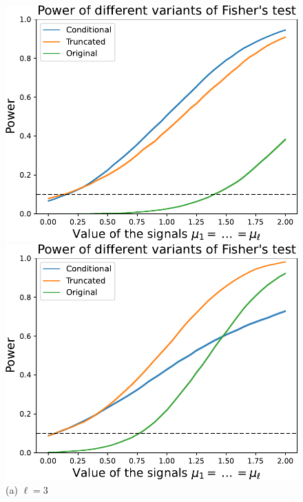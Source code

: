 \documentclass{article}
\begin{document}
\begin{figure}
    \centering
    \hspace{-0.035\textwidth}
    \begin{minipage}{0.32\textwidth}
        \centering
        \includegraphics[width=\textwidth]{fig/fisher_ell=3.pdf}
        \caption*{(a) $\ell=3$}
    \end{minipage}
    \hfill
    \hspace{0.01\textwidth}
    \begin{minipage}{0.32\textwidth}
        \centering
        \includegraphics[width=\textwidth]{fig/fisher_ell=5.pdf}

\end{minipage}
\end{figure}
\end{document}
